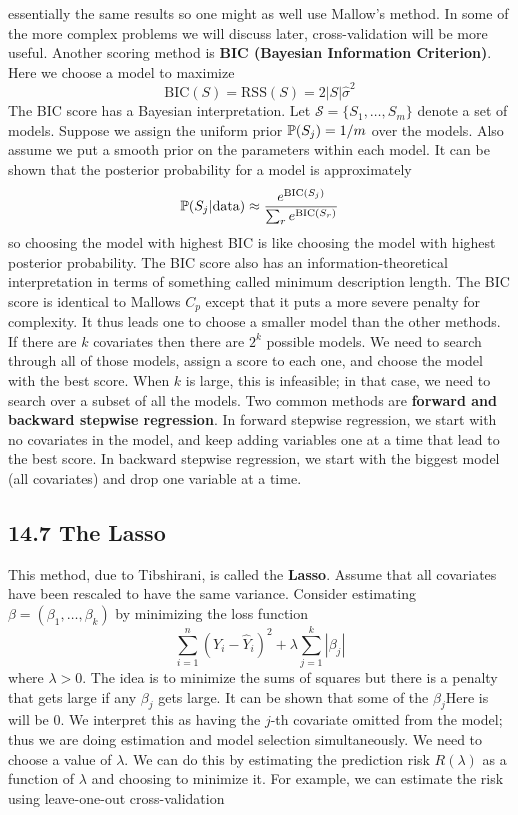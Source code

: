 essentially the same results so one might as well use Mallow's method.
In some of the more complex problems we will discuss later,
cross-validation will be more useful.
Another scoring method is \textbf{BIC (Bayesian Information Criterion)}.
Here we choose a model to maximize
\[
\text{BIC}(S) = \text{RSS}(S) = 2 |S| \hat{\sigma}^{2}
\]
The BIC score has a Bayesian interpretation. Let
\(\mathcal{S} = \{ S_{1}, \dots, S_m \}\) denote a set of models. Suppose
we assign the uniform prior \(\operatorname{\mathbb{P}}(S_{j}) = 1 / m\) over the models.
Also assume we put a smooth prior on the parameters within each model.
It can be shown that the posterior probability for a model is
approximately
\[
\operatorname{\mathbb{P}}(S_{j} | \text{data}) \approx \frac{e^{\text{BIC}(S_{j})}}{\sum_r e^{\text{BIC}(S_r)}}
\]
so choosing the model with highest BIC is like choosing the model with
highest posterior probability.
The BIC score also has an information-theoretical interpretation in
terms of something called minimum description length.
The BIC score is identical to Mallows \(C_p\) except that it puts a more
severe penalty for complexity. It thus leads one to choose a smaller
model than the other methods.
If there are \(k\) covariates then there are \(2^{k}\) possible models. We
need to search through all of those models, assign a score to each one,
and choose the model with the best score. When \(k\) is large, this is
infeasible; in that case, we need to search over a subset of all the
models. Two common methods are \textbf{forward and backward stepwise
regression}.
In forward stepwise regression, we start with no covariates in the
model, and keep adding variables one at a time that lead to the best
score. In backward stepwise regression, we start with the biggest model
(all covariates) and drop one variable at a time.

\subsection*{14.7 The Lasso}\label{the-lasso}
This method, due to Tibshirani, is called the \textbf{Lasso}. Assume
that all covariates have been rescaled to have the same variance.
Consider estimating \(\beta = (\beta_{1}, \dots, \beta_{k})\) by minimizing
the loss function
\[
\sum_{i=1}^{n} (Y_{i} - \hat{Y}_{i})^{2} + \lambda \sum_{j=1}^{k} | \beta_{j} |
\]
where \(\lambda > 0\). The idea is to minimize the sums of squares but
there is a penalty that gets large if any \(\beta_{j}\) gets large. It can
be shown that some of the \(\beta_{j}\)Here is will be 0. We interpret this as
having the \(j\)-th covariate omitted from the model; thus we are doing
estimation and model selection simultaneously.
We need to choose a value of \(\lambda\). We can do this by estimating
the prediction risk \(R(\lambda)\) as a function of \(\lambda\) and
choosing to minimize it. For example, we can estimate the risk using
leave-one-out cross-validation

